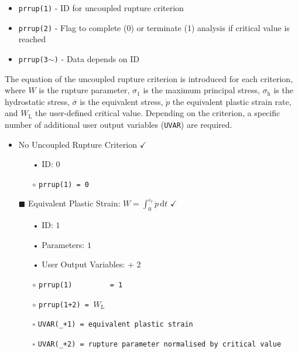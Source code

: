 \documentclass[11pt,a4paper,twoside,final,onecolumn,titlepage]{article}
\newcommand{\verified}{\hspace{0.5pt} {\LARGE $\checkmark$}}
\begin{document}
\begin{itemize}
	\item \texttt{prrup(1)} - ID for uncoupled rupture criterion
	\item \texttt{prrup(2)} - Flag to complete (0) or terminate (1) analysis if critical value is reached
	\item \texttt{prrup(3$\mathtt{\sim}$)} - Data depends on ID
\end{itemize}

\noindent The equation of the uncoupled rupture criterion is introduced for each criterion, where $W$ is the rupture parameter, $\sigma_{1}$ is the maximum principal stress, $\sigma_{\textrm{h}}$ is the hydrostatic stress, $\bar{\sigma}$ is the equivalent stress, $\dot{p}$ the equivalent plastic strain rate, and $W_\textrm{L}$ the user-defined critical value. Depending on the criterion, a specific number of additional user output variables (\texttt{UVAR}) are required.
\vspace{0.1cm}

\begin{itemize}
	\item No Uncoupled Rupture Criterion \verified{}
	\begin{itemize}
		\item[•] ID: $0$\\
		\item[$\circ$] \texttt{prrup(1) = 0}
	\end{itemize}
\end{itemize}

\pagebreak
\begin{itemize}
	\item[\tiny$\blacksquare$] Equivalent Plastic Strain: $\displaystyle W = \int_{0}^{\varepsilon_\textrm{f}} \dot{p}\,\text{d}t$ \verified{}
	\begin{itemize}
		\item[•] ID: $1$
		\item[•] Parameters: $1$
		\item[•] User Output Variables: + 2\\
		\item[$\circ$] \texttt{prrup(1)\,\,\,\,\,\,\,\,\,= 1}
		\item[$\circ$] \texttt{prrup(1+2) = $W_\textrm{L}$}\\
		\item[\tiny$\square$] \texttt{UVAR(\_+1) = equivalent plastic strain}
		\item[\tiny$\square$] \texttt{UVAR(\_+2) = rupture parameter normalised by critical value}\\
	\end{itemize}
\end{itemize}
\end{document}
